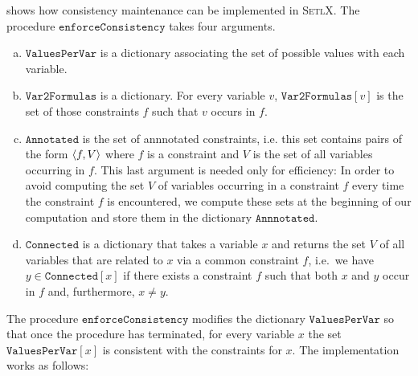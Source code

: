 \noindent
{} shows how consistency maintenance can be implemented in \textsc{SetlX}.
The procedure $\mathtt{enforceConsistency}$ takes four arguments.
\begin{enumerate}[(a)]
\item $\mathtt{ValuesPerVar}$ is a dictionary associating the set of possible values with each variable.
\item $\mathtt{Var2Formulas}$ is a dictionary.  For every variable $v$, $\mathtt{Var2Formulas}[v]$ is
      the set of those constraints $f$ such that $v$ occurs in $f$.
\item $\mathtt{Annotated}$ is the set of annnotated constraints, i.e. this set contains
      pairs of the form $\pair(f, V)$ where $f$ is a constraint and $V$ is the set of all variables occurring
      in $f$.  This last argument is needed only for efficiency: In order to avoid computing the set $V$ of
      variables occurring in a constraint $f$ every time the constraint $f$ is encountered, we compute these
      sets at the beginning of our computation and store them in the dictionary $\mathtt{Annnotated}$.
\item $\mathtt{Connected}$ is a dictionary that takes a variable $x$ and returns the set $V$ of all variables
      that are related to $x$ via a common constraint $f$, i.e.~we have $y \in \mathtt{Connected}[x]$
      if there exists a constraint $f$ such that both $x$ and $y$ occur in $f$ and, furthermore, $x \not= y$.
\end{enumerate}
The procedure $\mathtt{enforceConsistency}$ modifies the dictionary $\mathtt{ValuesPerVar}$ so that once the
procedure has terminated, for every variable $x$ the set
$\mathtt{ValuesPerVar}[x]$ is consistent with the constraints for $x$.  The implementation works as follows:
